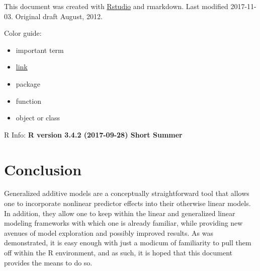\documentclass[]{tufte-book}
\providecommand{\tightlist}{%
  \setlength{\itemsep}{0pt}\setlength{\parskip}{0pt}}
\begin{document}
This document was created with \href{http://rstudio.org/}{Rstudio} and
rmarkdown. {Last modified 2017-11-03. Original draft August, 2012.}

\cite{Betebenner:2009}

Color guide:

\begin{itemize}
\tightlist
\item
  {important term}
\item
  \href{}{link}
\item
  {package}
\item
  {function}
\item
  {object or class}
\end{itemize}

R Info: \textbf{R version 3.4.2 (2017-09-28) Short Summer}

\chapter{Conclusion}\label{conclusion}

Generalized additive models are a conceptually straightforward tool that
allows one to incorporate nonlinear predictor effects into their
otherwise linear models. In addition, they allow one to keep within the
linear and generalized linear modeling frameworks with which one is
already familiar, while providing new avenues of model exploration and
possibly improved results. As was demonstrated, it is easy enough with
just a modicum of familiarity to pull them off within the R environment,
and as such, it is hoped that this document provides the means to do so.

\renewcommand\bibname{References}

\end{document}
